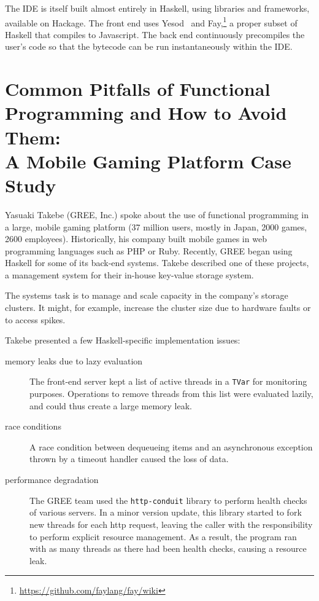 \documentclass{jfp1}
\begin{document}
The IDE is itself built almost entirely in Haskell, using libraries and
frameworks, available on Hackage.  The front end uses
Yesod~\cite{Snoyman:2012:Developing} and
Fay,\footnote{\url{https://github.com/faylang/fay/wiki}} a proper subset
of Haskell that compiles to Javascript. The back end continuously
precompiles the user's code so that the bytecode can be run
instantaneously within the IDE.

\section{Common Pitfalls of Functional Programming and How 
to Avoid Them:\\ A Mobile Gaming Platform Case Study}


Yasuaki Takebe (GREE, Inc.) spoke about the use of functional programming
in a large, mobile gaming platform (37 million users, mostly in Japan,
2000 games, 2600 employees).  Historically, his company built mobile games
in web programming languages such as PHP or Ruby. Recently, GREE began
using Haskell for some of its back-end systems. Takebe described one of
these projects, a management system for their in-house key-value storage
system.

The systems task is to manage and scale capacity in the company's storage
clusters. It might, for example, increase the cluster size due to hardware
faults or to access spikes.

Takebe presented a few Haskell-specific implementation issues:

\begin{description}

\item[memory leaks due to lazy evaluation] The front-end server kept a
list of active threads in a \texttt{TVar} for monitoring purposes. Operations
to remove threads from this list were evaluated lazily, and could thus
create a large memory leak.

\item[race conditions] A race condition between dequeueing items and an
asynchronous exception thrown by a timeout handler caused the loss of data.

\item[performance degradation] The GREE team used the \texttt{http-conduit}
library to perform health checks of various servers. In a minor version
update, this library started to fork new threads for each http request,
leaving the caller with the responsibility to perform explicit resource
management. As a result, the program ran with as many threads as there had
been health checks, causing a resource leak. 
\end{description}
\end{document}
